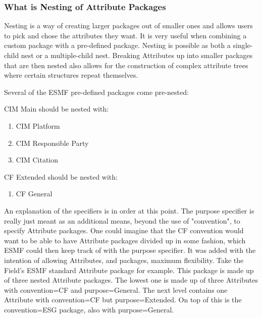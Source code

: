 %


\label{desc:AttPacksNesting}


\subsubsection {What is Nesting of Attribute Packages}


Nesting is a way of creating larger packages out of smaller ones and allows users to pick and chose the attributes they want. It is very useful when combining a custom package with a pre-defined package. Nesting is possible as both a single-child nest or a multiple-child nest. Breaking Attributes up into smaller packages that are then nested also allows for the construction of complex attribute trees where certain structures repeat themselves.  


Several of the ESMF pre-defined packages come pre-nested:

CIM Main should be nested with:
\begin{enumerate}
   \item CIM Platform
   \item CIM Responsible Party
   \item CIM Citation
\end{enumerate}

CF Extended should be nested with:

\begin{enumerate}
   \item CF General
\end{enumerate}

An explanation of the specifiers is in order at this point.  The purpose 
specifier is really just meant as an additional means, beyond the use of 
"convention", to specify Attribute packages.  One could imagine that the 
CF convention would want to be able to have Attribute packages divided 
up in some fashion, which ESMF could then keep track of with the purpose 
specifier.  It was added with the intention of allowing Attributes, and 
packages, maximum flexibility.  Take the Field's ESMF standard Attribute 
package for example.  This 
package is made up of three nested Attribute packages.  The lowest one 
is made up of three Attributes with convention=CF and purpose=General.  
The next level contains one Attribute with convention=CF but 
purpose=Extended.  On top of this is the convention=ESG package, also 
with purpose=General.
